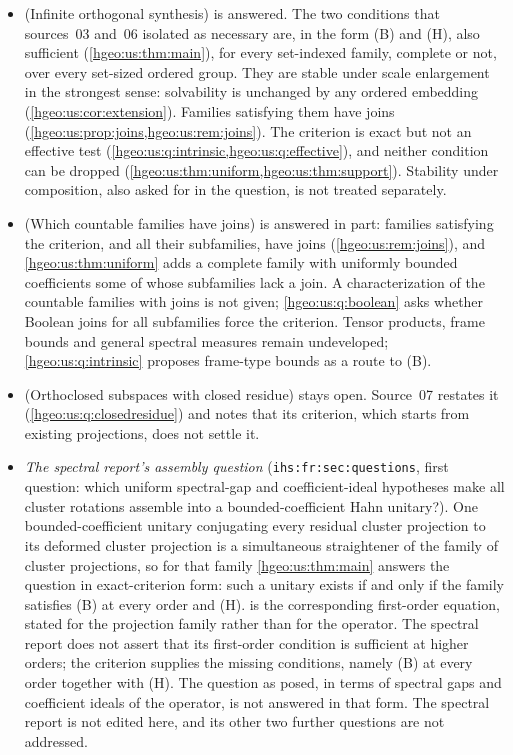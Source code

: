 \documentclass[11pt,letterpaper]{article}
\numberwithin{equation}{section}
\theoremstyle{definition}
\theoremstyle{remark}
\newcommand{\replabel}[1]{\nolinkurl{#1}}
\begin{document}
\begin{itemize}[leftmargin=*]
\item \emph{} (Infinite orthogonal synthesis) is
answered. The two conditions that sources~03 and~06 isolated as necessary are,
in the form (B) and (H), also sufficient (\cref{hgeo:us:thm:main}), for every
set-indexed family, complete or not, over every set-sized ordered group. They
are stable under scale enlargement in the strongest sense: solvability is
unchanged by any ordered embedding (\cref{hgeo:us:cor:extension}). Families
satisfying them have joins (\cref{hgeo:us:prop:joins,hgeo:us:rem:joins}).
The criterion is exact but not an effective test
(\cref{hgeo:us:q:intrinsic,hgeo:us:q:effective}), and neither condition can be
dropped (\cref{hgeo:us:thm:uniform,hgeo:us:thm:support}). Stability under
composition, also asked for in the question, is not treated separately.
\item \emph{} (Which countable families have joins)
is answered in part: families satisfying the criterion, and all their
subfamilies, have joins (\cref{hgeo:us:rem:joins}), and
\cref{hgeo:us:thm:uniform} adds a complete family with uniformly bounded
coefficients some of whose subfamilies lack a join. A characterization of the
countable families with joins is not given; \cref{hgeo:us:q:boolean} asks
whether Boolean joins for all subfamilies force the criterion. Tensor
products, frame bounds and general spectral measures remain undeveloped;
\cref{hgeo:us:q:intrinsic} proposes frame-type bounds as a route to (B).
\item \emph{} (Orthoclosed subspaces with closed
residue) stays open. Source~07 restates it (\cref{hgeo:us:q:closedresidue})
and notes that its criterion, which starts from existing projections, does not
settle it.
\item \emph{The spectral report's assembly question}
(\replabel{ihs:fr:sec:questions}, first question: which uniform spectral-gap
and coefficient-ideal hypotheses make all cluster rotations assemble into a
bounded-coefficient Hahn unitary?). One bounded-coefficient unitary
conjugating every residual cluster projection to its deformed cluster
projection is a simultaneous straightener of the family of cluster
projections, so for that family \cref{hgeo:us:thm:main} answers the question
in exact-criterion form: such a unitary exists if and only if the family
satisfies (B) at every order and (H).  is the
corresponding first-order equation, stated for the projection family rather
than for the operator. The spectral report does not assert that its
first-order condition is sufficient at higher orders; the criterion supplies
the missing conditions, namely (B) at every order together with (H). The
question as posed, in terms of spectral gaps and coefficient ideals of the
operator, is not answered in that form. The spectral report is not edited
here, and its other two further questions are not addressed.
\end{itemize}
\end{document}
